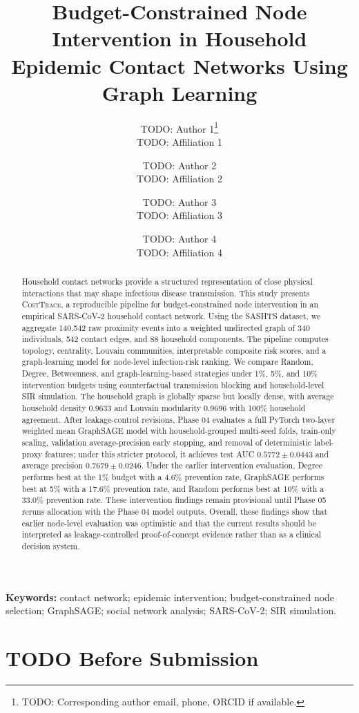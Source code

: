 \documentclass[11pt,a4paper]{article}
\title{Budget-Constrained Node Intervention in Household Epidemic Contact Networks Using Graph Learning}
\author{
  TODO: Author 1\thanks{TODO: Corresponding author email, phone, ORCID if available.}\\
  TODO: Affiliation 1
  \and
  TODO: Author 2\\
  TODO: Affiliation 2
  \and
  TODO: Author 3\\
  TODO: Affiliation 3
  \and
  TODO: Author 4\\
  TODO: Affiliation 4
}
\date{}
\newcommand{\costtrace}{\textsc{CostTrace}}
\begin{document}
\maketitle

\begin{abstract}
Household contact networks provide a structured representation of close physical interactions that may shape infectious disease transmission. This study presents \costtrace, a reproducible pipeline for budget-constrained node intervention in an empirical SARS-CoV-2 household contact network. Using the SASHTS dataset, we aggregate 140,542 raw proximity events into a weighted undirected graph of 340 individuals, 542 contact edges, and 88 household components. The pipeline computes topology, centrality, Louvain communities, interpretable composite risk scores, and a graph-learning model for node-level infection-risk ranking. We compare Random, Degree, Betweenness, and graph-learning-based strategies under 1\%, 5\%, and 10\% intervention budgets using counterfactual transmission blocking and household-level SIR simulation. The household graph is globally sparse but locally dense, with average household density 0.9633 and Louvain modularity 0.9696 with 100\% household agreement. After leakage-control revisions, Phase 04 evaluates a full PyTorch two-layer weighted mean GraphSAGE model with household-grouped multi-seed folds, train-only scaling, validation average-precision early stopping, and removal of deterministic label-proxy features; under this stricter protocol, it achieves test AUC \(0.5772 \pm 0.0443\) and average precision \(0.7679 \pm 0.0246\). Under the earlier intervention evaluation, Degree performs best at the 1\% budget with a 4.6\% prevention rate, GraphSAGE performs best at 5\% with a 17.6\% prevention rate, and Random performs best at 10\% with a 33.0\% prevention rate. These intervention findings remain provisional until Phase 05 reruns allocation with the Phase 04 model outputs. Overall, these findings show that earlier node-level evaluation was optimistic and that the current results should be interpreted as leakage-controlled proof-of-concept evidence rather than as a clinical decision system.
\end{abstract}

\noindent\textbf{Keywords:} contact network; epidemic intervention; budget-constrained node selection; GraphSAGE; social network analysis; SARS-CoV-2; SIR simulation.

\section*{TODO Before Submission}
\end{document}
